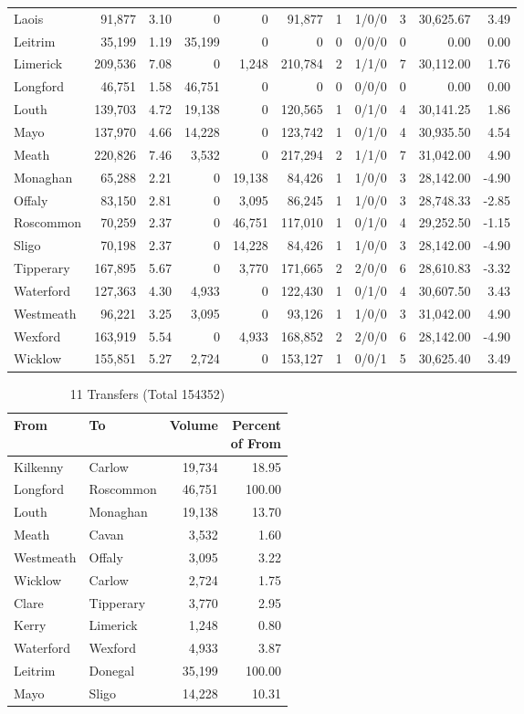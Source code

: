 \documentclass[a4paper]{article}
\begin{document}
\begin{longtable}{lrrrrrrlrrr}
Laois&91,877& 3.10&0&0&91,877&1&1/0/0&3&30,625.67& 3.49\\ 
Leitrim&35,199& 1.19&35,199&0&0&0&0/0/0&0& 0.00& 0.00\\ 
Limerick&209,536& 7.08&0&1,248&210,784&2&1/1/0&7&30,112.00& 1.76\\ 
Longford&46,751& 1.58&46,751&0&0&0&0/0/0&0& 0.00& 0.00\\ 
Louth&139,703& 4.72&19,138&0&120,565&1&0/1/0&4&30,141.25& 1.86\\ 
Mayo&137,970& 4.66&14,228&0&123,742&1&0/1/0&4&30,935.50& 4.54\\ 
Meath&220,826& 7.46&3,532&0&217,294&2&1/1/0&7&31,042.00& 4.90\\ 
Monaghan&65,288& 2.21&0&19,138&84,426&1&1/0/0&3&28,142.00&-4.90\\ 
Offaly&83,150& 2.81&0&3,095&86,245&1&1/0/0&3&28,748.33&-2.85\\ 
Roscommon&70,259& 2.37&0&46,751&117,010&1&0/1/0&4&29,252.50&-1.15\\ 
Sligo&70,198& 2.37&0&14,228&84,426&1&1/0/0&3&28,142.00&-4.90\\ 
Tipperary&167,895& 5.67&0&3,770&171,665&2&2/0/0&6&28,610.83&-3.32\\ 
Waterford&127,363& 4.30&4,933&0&122,430&1&0/1/0&4&30,607.50& 3.43\\ 
Westmeath&96,221& 3.25&3,095&0&93,126&1&1/0/0&3&31,042.00& 4.90\\ 
Wexford&163,919& 5.54&0&4,933&168,852&2&2/0/0&6&28,142.00&-4.90\\ 
Wicklow&155,851& 5.27&2,724&0&153,127&1&0/0/1&5&30,625.40& 3.49\\ 
\end{longtable}

\begin{table}[htbp]
\caption{11 Transfers (Total 154352)}
\centering
\begin{tabular}{llrr} \toprule
From &To &Volume &\shortstack{Percent\\of From} \\ \midrule
Kilkenny&Carlow&19,734&18.95\\ 
Longford&Roscommon&46,751&100.00\\ 
Louth&Monaghan&19,138&13.70\\ 
Meath&Cavan&3,532& 1.60\\ 
Westmeath&Offaly&3,095& 3.22\\ 
Wicklow&Carlow&2,724& 1.75\\ 
Clare&Tipperary&3,770& 2.95\\ 
Kerry&Limerick&1,248& 0.80\\ 
Waterford&Wexford&4,933& 3.87\\ 
Leitrim&Donegal&35,199&100.00\\ 
Mayo&Sligo&14,228&10.31\\ 
\bottomrule
\end{tabular}
\end{table}
\end{document}
